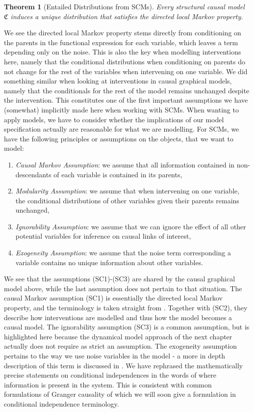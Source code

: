 \documentclass[11pt, a4paper]{memoir}
\theoremstyle{break}
\newtheorem{thm}{Theorem}
\theoremstyle{break}
\theoremstyle{nonumberplain}
\begin{document}
\begin{thm}[Entailed Distributions from SCMs]\label{entail}
Every structural causal model $\mathfrak{C}$ induces a unique distribution that satisfies the directed local Markov property.
\end{thm}
We see the directed local Markov property stems directly from conditioning on the parents in the functional expression for each variable, which leaves a term depending only on the noise. This is also the key when modelling interventions here, namely that the conditional distributions when conditioning on parents do not change for the rest of the variables when intervening on one variable. We did something similar when looking at interventions in causal graphical models, namely that the conditionals for the rest of the model remains unchanged despite the intervention. This constitutes one of the first important assumptions we have (somewhat) implicitly made here when working with SCMs. When wanting to apply models, we have to consider whether the implications of our model specification actually are reasonable for what we are modelling. For SCMs, we have the following principles or assumptions on the objects, that we want to model:
\begin{enumerate}[itemindent=15pt,label=(SC\arabic*)]
	\item \emph{Causal Markov Assumption}: we assume that all information contained in non-descendants of each variable is contained in its parents,
	\item \emph{Modularity Assumption}: we assume that when intervening on one variable, the conditional distributions of other variables given their parents remains unchanged,
	\item \emph{Ignorability Assumption}: we assume that we can ignore the effect of all other potential variables for inference on causal links of interest,
	\item \emph{Exogeneity Assumption}: we assume that the noise term corresponding a variable contains no unique information about other variables.
\end{enumerate}
We see that the assumptions (SC1)-(SC3) are shared by the causal graphical model above, while the last assumption does not pertain to that situation.  The causal Markov assumption (SC1) is essentially the directed local Markov property, and the terminology is taken straight from \cite{Spirtes}. Together with (SC2), they describe how interventions are modelled and thus how the model becomes a causal model.  The ignorability assumption (SC3) is a common assumption, but is highlighted here because the dynamical model approach of the next chapter actually does not require as strict an assumption. The exogeneity assumption pertains to the way we use noise variables in the model - a more in depth description of this term is discussed in \cite{Engle}. We have rephrased the mathematically precise statements on conditional independences in the words of where information is present in the system. This is consistent with common formulations of Granger causality of which we will soon give a formulation in conditional independence terminology.\\\\
\end{document}
